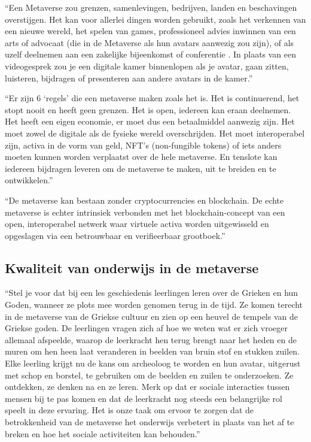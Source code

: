 \documentclass{hogent-article}
\begin{document}
``Een Metaverse zou grenzen, samenlevingen, bedrijven, landen en beschavingen overstijgen. Het kan voor allerlei dingen worden gebruikt, zoals het verkennen van een nieuwe wereld, het spelen van games, professioneel advies inwinnen van een arts of advocaat (die in de Metaverse als hun avatars aanwezig zou zijn), of als uzelf deelnemen aan een zakelijke bijeenkomst of conferentie . In plaats van een videogesprek zou je een digitale kamer binnenlopen als je avatar, gaan zitten, luisteren, bijdragen of presenteren aan andere avatars in de kamer.'' \autocite{Phemex}

``Er zijn 6 ‘regels’ die een metaverse maken zoals het is. Het is continuerend, het stopt nooit en heeft geen grenzen. Het is open, iedereen kan eraan deelnemen. Het heeft een eigen economie, er moet dus een betaalmiddel aanwezig zijn. Het moet zowel de digitale als de fysieke wereld overschrijden. Het moet interoperabel zijn, activa in de vorm van geld, NFT’s (non-fungible tokens) of iets anders moeten kunnen worden verplaatst over de hele metaverse. En tenslote kan iedereen bijdragen leveren om de metaverse te maken, uit te breiden en te ontwikkelen.'' \autocite{Phemex}

``De metaverse kan bestaan zonder cryptocurrencies en blockchain. De echte metaverse is echter intrinsiek verbonden met het blockchain-concept van een open, interoperabel netwerk waar virtuele activa worden uitgewisseld en opgeslagen via een betrouwbaar en verifieerbaar grootboek.'' \autocite{Capra2022}

\subsection{Kwaliteit van onderwijs in de metaverse}
``Stel je voor dat bij een les geschiedenis leerlingen leren over de Grieken en hun Goden, wanneer ze plots mee worden genomen terug in de tijd. Ze komen terecht in de metaverse van de Griekse cultuur en zien op een heuvel de tempels van de Griekse goden. De leerlingen vragen zich af hoe we weten wat er zich vroeger allemaal afspeelde, waarop de leerkracht hen terug brengt naar het heden en de muren om hen heen laat veranderen in beelden van bruin stof en stukken zuilen. Elke leerling krijgt nu de kans om archeoloog te worden en hun avatar, uitgerust met schop en borstel, te gebruiken om de beelden en zuilen te onderzoeken. Ze ontdekken, ze denken na en ze leren. Merk op dat er sociale interacties tussen mensen bij te pas komen en dat de leerkracht nog steeds een belangrijke rol speelt in deze ervaring. Het is onze taak om ervoor te zorgen dat de betrokkenheid van de metaverse het onderwijs verbetert in plaats van het af te breken en hoe het sociale activiteiten kan behouden.'' \autocite{HirshPasek2022}
\end{document}

